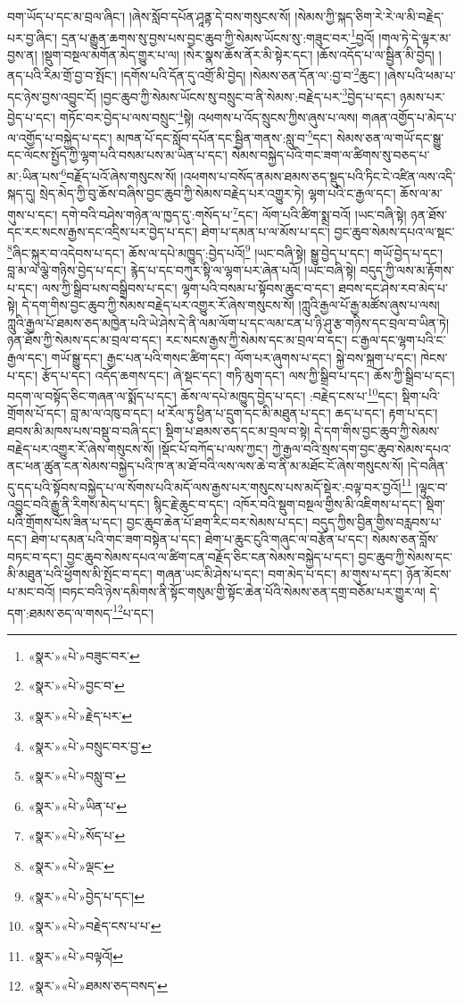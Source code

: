 བག་ཡོད་པ་དང་མ་བྲལ་ཞིང་། །ཞེས་སློབ་དཔོན་ཤཱནྟ་དེ་བས་གསུངས་སོ། །སེམས་ཀྱི་སྐད་ཅིག་རེ་རེ་ལ་མི་བརྗེད་པར་བྱ་ཞིང་། དྲན་པ་རྒྱུན་ཆགས་སུ་བྱས་པས་བྱང་ཆུབ་ཀྱི་སེམས་ཡོངས་སུ་:གཟུང་བར་\footnote{«སྣར་»«པེ་»བཟུང་བར་}བྱའོ། །གལ་ཏེ་དེ་ལྟར་མ་བྱས་ན། །སྡུག་བསྔལ་མགོན་མེད་གྱུར་པ་ལ། །སེར་སྣས་ཆོས་ནོར་མི་སྟེར་དང་། །ཆོས་འདོད་པ་ལ་སྦྱིན་མི་བྱེད། །ནད་པའི་རིམ་གྲོ་བྱ་བ་སྤོང་། །དགོས་པའི་དོན་དུ་འགྲོ་མི་བྱེད། །སེམས་ཅན་དོན་ལ་:བྱ་བ་\footnote{«སྣར་»«པེ་»བྱང་བ་}ཆུང་། །ཞེས་པའི་ཕམ་པ་དང་ཉེས་བྱས་འབྱུང་ངོ། །བྱང་ཆུབ་ཀྱི་སེམས་ཡོངས་སུ་བསྲུང་བ་ནི་སེམས་:བརྗེད་པར་\footnote{«སྣར་»«པེ་»རྗེད་པར་}བྱེད་པ་དང་། ཉམས་པར་བྱེད་པ་དང་། གཏོང་བར་བྱེད་པ་ལས་བསྲུང་\footnote{«སྣར་»«པེ་»བསྲུང་བར་བྱ་}སྟེ། འཕགས་པ་འོད་སྲུངས་ཀྱིས་ཞུས་པ་ལས། གཞན་འགྱོད་པ་མེད་པ་ལ་འགྱོད་པ་བསྐྱེད་པ་དང་། མཁན་པོ་དང་སློབ་དཔོན་དང་སྦྱིན་གནས་:སླུ་བ་\footnote{«སྣར་»«པེ་»བསླུ་བ་}དང་། སེམས་ཅན་ལ་གཡོ་དང་སྒྱུ་དང་ལོངས་སྤྱོད་ཀྱི་ལྷག་པའི་བསམ་པས་མ་ཡིན་པ་དང་། སེམས་བསྐྱེད་པའི་གང་ཟག་ལ་ཚིགས་སུ་བཅད་པ་མ་:ཡིན་པས་\footnote{«སྣར་»«པེ་»ཡིན་པ་}བརྗོད་པའོ་ཞེས་གསུངས་སོ། །འཕགས་པ་བསོད་ནམས་ཐམས་ཅད་སྡུད་པའི་ཏིང་ངེ་འཛིན་ལས་འདི་སྐད་དུ། སྲེད་མེད་ཀྱི་བུ་ཆོས་བཞིས་བྱང་ཆུབ་ཀྱི་སེམས་བརྗེད་པར་འགྱུར་ཏེ། ལྷག་པའི་ང་རྒྱལ་དང་། ཆོས་ལ་མ་གུས་པ་དང་། དགེ་བའི་བཤེས་གཉེན་ལ་ཁྱད་དུ་:གསོད་པ་\footnote{«སྣར་»«པེ་»སོད་པ་}དང་། ལོག་པའི་ཚིག་སྨྲ་བའོ། །ཡང་བཞི་སྟེ། ཉན་ཐོས་དང་རང་སངས་རྒྱས་དང་འདྲིས་པར་བྱེད་པ་དང་། ཐེག་པ་དམན་པ་ལ་མོས་པ་དང་། བྱང་ཆུབ་སེམས་དཔའ་ལ་སྡང་\footnote{«སྣར་»«པེ་»ལྡང་}ཞིང་སྐུར་བ་འདེབས་པ་དང་། ཆོས་ལ་དཔེ་མཁྱུད་:བྱེད་པའོ།\footnote{«སྣར་»«པེ་»བྱེད་པ་དང་།} །ཡང་བཞི་སྟེ། སྒྱུ་བྱེད་པ་དང་། གཡོ་བྱེད་པ་དང་། བླ་མ་ལ་ལྕེ་གཉིས་བྱེད་པ་དང་། རྙེད་པ་དང་བཀུར་སྟི་ལ་ལྷག་པར་ཞེན་པའོ། །ཡང་བཞི་སྟེ། བདུད་ཀྱི་ལས་མ་རྟོགས་པ་དང་། ལས་ཀྱི་སྒྲིབ་པས་བསྒྲིབས་པ་དང་། ལྷག་པའི་བསམ་པ་སྟོབས་ཆུང་བ་དང་། ཐབས་དང་ཤེས་རབ་མེད་པ་སྟེ། དེ་དག་གིས་བྱང་ཆུབ་ཀྱི་སེམས་བརྗེད་པར་འགྱུར་རོ་ཞེས་གསུངས་སོ། །ཀླུའི་རྒྱལ་པོ་རྒྱ་མཚོས་ཞུས་པ་ལས། ཀླུའི་རྒྱལ་པོ་ཐམས་ཅད་མཁྱེན་པའི་ཡེ་ཤེས་དེ་ནི་ལམ་ལོག་པ་དང་ལམ་ངན་པ་ཉི་ཤུ་རྩ་གཉིས་དང་བྲལ་བ་ཡིན་ཏེ། ཉན་ཐོས་ཀྱི་སེམས་དང་མ་བྲལ་བ་དང་། རང་སངས་རྒྱས་ཀྱི་སེམས་དང་མ་བྲལ་བ་དང་། ང་རྒྱལ་དང་ལྷག་པའི་ང་རྒྱལ་དང་། གཡོ་སྒྱུ་དང་། རྒྱང་པན་པའི་གསང་ཚིག་དང་། ལོག་པར་ཞུགས་པ་དང་། སྐྱེ་བས་སྐྲག་པ་དང་། ཁེངས་པ་དང་། རྩོད་པ་དང་། འདོད་ཆགས་དང་། ཞེ་སྡང་དང་། གཏི་མུག་དང་། ལས་ཀྱི་སྒྲིབ་པ་དང་། ཆོས་ཀྱི་སྒྲིབ་པ་དང་། བདག་ལ་བསྟོད་ཅིང་གཞན་ལ་སྨོད་པ་དང་། ཆོས་ལ་དཔེ་མཁྱུད་བྱེད་པ་དང་། :བརྗེད་ངས་པ་\footnote{«སྣར་»«པེ་»བརྗེད་ངས་པ་པ་}དང་། སྡིག་པའི་གྲོགས་པོ་དང་། བླ་མ་ལ་འཁུ་བ་དང་། ཕ་རོལ་ཏུ་ཕྱིན་པ་དྲུག་དང་མི་མཐུན་པ་དང་། ཆད་པ་དང་། རྟག་པ་དང་། ཐབས་མི་མཁས་པས་བསྡུ་བ་བཞི་དང་། སྡིག་པ་ཐམས་ཅད་དང་མ་བྲལ་བ་སྟེ། དེ་དག་གིས་བྱང་ཆུབ་ཀྱི་སེམས་བརྗེད་པར་འགྱུར་རོ་ཞེས་གསུངས་སོ། །སྡོང་པོ་བཀོད་པ་ལས་ཀྱང་། ཀྱེ་རྒྱལ་བའི་སྲས་དག་བྱང་ཆུབ་སེམས་དཔའ་ནང་ཕན་ཚུན་ངན་སེམས་བསྐྱེད་པའི་ཁ་ན་མ་ཐོ་བའི་ལས་ལས་ཆེ་བ་ནི་མ་མཐོང་ངོ་ཞེས་གསུངས་སོ། །དེ་བཞིན་དུ་དད་པའི་སྟོབས་བསྐྱེད་པ་ལ་སོགས་པའི་མདོ་ལས་རྒྱས་པར་གསུངས་པས་མདོ་སྡེར་:བལྟ་བར་བྱའོ།\footnote{«སྣར་»«པེ་»བལྟའོ།} །ལྟུང་བ་འབྱུང་བའི་རྒྱུ་ནི་རིགས་མེད་པ་དང་། སྙིང་རྗེ་ཆུང་བ་དང་། འཁོར་བའི་སྡུག་བསྔལ་གྱིས་མི་འཇིགས་པ་དང་། སྡིག་པའི་གྲོགས་པོས་ཟིན་པ་དང་། བྱང་ཆུབ་ཆེན་པོ་ཐག་རིང་བར་སེམས་པ་དང་། བདུད་ཀྱིས་བྱིན་གྱིས་བརླབས་པ་དང་། ཐེག་པ་དམན་པའི་གང་ཟག་བསྟེན་པ་དང་། ཐེག་པ་ཆུང་ངུའི་གཞུང་ལ་བརྩོན་པ་དང་། སེམས་ཅན་བློས་བཏང་བ་དང་། བྱང་ཆུབ་སེམས་དཔའ་ལ་ཚིག་ངན་བརྗོད་ཅིང་ངན་སེམས་བསྐྱེད་པ་དང་། བྱང་ཆུབ་ཀྱི་སེམས་དང་མི་མཐུན་པའི་ཕྱོགས་མི་སྤོང་བ་དང་། གཞན་ཡང་མི་ཤེས་པ་དང་། བག་མེད་པ་དང་། མ་གུས་པ་དང་། ཉོན་མོངས་པ་མང་བའོ། །བཏང་བའི་ཉེས་དམིགས་ནི་སྟོང་གསུམ་གྱི་སྟོང་ཆེན་པོའི་སེམས་ཅན་དགྲ་བཅོམ་པར་གྱུར་ལ། དེ་དག་:ཐམས་ཅད་ལ་གསད་\footnote{«སྣར་»«པེ་»ཐམས་ཅད་བསད་}པ་དང་། 